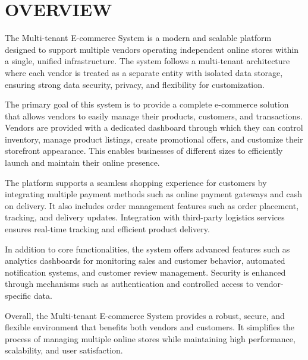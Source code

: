 \chapter{OVERVIEW}\label{obj}
The Multi-tenant E-commerce System is a modern and scalable platform designed to support multiple vendors operating independent online stores within a single, unified infrastructure. The system follows a multi-tenant architecture where each vendor is treated as a separate entity with isolated data storage, ensuring strong data security, privacy, and flexibility for customization.

The primary goal of this system is to provide a complete e-commerce solution that allows vendors to easily manage their products, customers, and transactions. Vendors are provided with a dedicated dashboard through which they can control inventory, manage product listings, create promotional offers, and customize their storefront appearance. This enables businesses of different sizes to efficiently launch and maintain their online presence.

The platform supports a seamless shopping experience for customers by integrating multiple payment methods such as online payment gateways and cash on delivery. It also includes order management features such as order placement, tracking, and delivery updates. Integration with third-party logistics services ensures real-time tracking and efficient product delivery.

In addition to core functionalities, the system offers advanced features such as analytics dashboards for monitoring sales and customer behavior, automated notification systems, and customer review management. Security is enhanced through mechanisms such as authentication and controlled access to vendor-specific data.

Overall, the Multi-tenant E-commerce System provides a robust, secure, and flexible environment that benefits both vendors and customers. It simplifies the process of managing multiple online stores while maintaining high performance, scalability, and user satisfaction.















